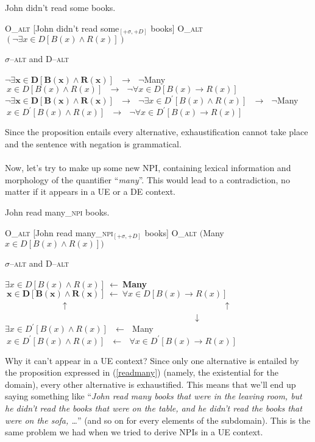 \documentclass[a4paper,11pt]{article}
\newcommand{\reff}[1]{(\ref{#1})}
\newcommand{\exs}[2][]{\begin{exe}\ex #1 \begin{xlist}#2\end{xlist}\end{exe}}
\begin{document}
\exs[\label{readsomeneg}]{
  \ex John didn't read some books.
  \ex
    \begin{xlist}
      \ex\label{readsomeoneg} O_{\textsc{alt}} [John didn't read some$_{[+\sigma,+D]}$ books]
      \ex O_{\textsc{alt}} $(\neg \exists{x \in D}[B(x) \wedge R(x)])$
    \end{xlist}
  \ex\label{readsomealtneg} $\sigma$--\textsc{alt} and D--\textsc{alt}
    \begin{xlist}
      \ex $\boldsymbol{\neg \exists{x \in D}[B(x) \wedge R(x)]}~~~\longrightarrow~~~\neg $Many$~{x \in D}[B(x) \wedge R(x)]~~~\longrightarrow~~~\neg \forall{x \in D}[B(x) \rightarrow R(x)]$
      \ex $\boldsymbol{\neg \exists{x \in D}[B(x) \wedge R(x)]}~~~\longrightarrow~~~\neg \exists{x \in D^{\prime}}[B(x) \wedge R(x)]~~~\longrightarrow~~~\neg $Many$~{x \in D^{\prime}}[B(x) \wedge R(x)]~~~\longrightarrow~~~\neg \forall{x \in D^{\prime}}[B(x) \rightarrow R(x)]$
    \end{xlist}
}
%
Since the proposition entails every alternative, exhaustification cannot take place and the sentence with negation is grammatical.

\paragraph{}
Now, let's try to make up some new NPI, containing lexical information and morphology of the quantifier \enquote{\emph{many}}. This would lead to a contradiction, no matter if it appears in a UE or a DE context.

\exs{
  \ex\label{readmany} John read many_{\textsc{npi}} books.
  \ex
    \begin{xlist}
      \ex\label{readmanyo} O_{\textsc{alt}} [John read many_{\textsc{npi}}$_{[+\sigma,+D]}$ books]
      \ex O_{\textsc{alt}} $($Many ${x \in D}[B(x) \wedge R(x)])$
    \end{xlist}
  \ex\label{readmanyalt} $\sigma$--\textsc{alt} and D--\textsc{alt}
    \begin{xlist}
      \ex $\exists{x \in D}[B(x) \wedge R(x)]~\longleftarrow~$\textbf{Many}$\boldsymbol{~{x \in D}[B(x) \wedge R(x)]}~\longleftarrow~\forall{x \in D}[B(x) \rightarrow R(x)]$\\
      \indent~~~~~~~~~~~~~$\uparrow$~~~~~~~~~~~~~~~~~~~~~~~~~~~~~~~~~~~~$\uparrow$~~~~~~~~~~~~~~~~~~~~~~~~~~~~~~~~~~~~~~~~~~~~$\downarrow$
      \ex $\exists{x \in D^{\prime}}[B(x) \wedge R(x)]~~~\longleftarrow~~~$Many$~{x \in D^{\prime}}[B(x) \wedge R(x)]~~~\longleftarrow~~~\forall{x \in D^{\prime}}[B(x) \rightarrow R(x)]$
    \end{xlist}
}
%
Why it can't appear in a UE context? Since only one alternative is entailed by the proposition expressed in \reff{readmany} (namely, the existential for the domain), every other alternative is exhaustified. This means that we'll end up saying something like \enquote{\emph{John read many books that were in the leaving room, but he didn't read the books that were on the table, and he didn't read the books that were on the sofa, \ldots{}}} (and so on for every elements of the subdomain). This is the same problem we had when we tried to derive NPIs in a UE context.
\end{document}
